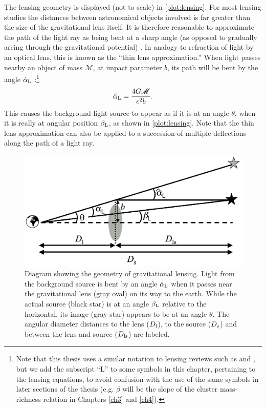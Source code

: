 The lensing geometry is displayed (not to scale) in \autoref{plot:lensing}. For most lensing studies the distances between astronomical objects involved is far greater than the size of the gravitational lens itself. It is therefore reasonable to approximate the path of the light ray as being bent at a sharp angle (as opposed to gradually arcing through the gravitational potential) \citep{BS01}. In analogy to refraction of light by an optical lens, this is known as the ``thin lens approximation.'' When light passes nearby an object of mass ${\mathscr M}$, at impact parameter $b$, its path will be bent by the angle $\hat{\alpha}_{\rm L}$ \citep{RydenText}:\footnote{Note that this thesis uses a similar notation to lensing reviews such as \citet{BS01} and \citet{Schneider06_WeakGravLens}, but we add the subscript ``L'' to some symbols in this chapter, pertaining to the lensing equations, to avoid confusion with the use of the same symbols in later sections of the thesis (e.g. $\beta$ will be the slope of the cluster mass-richness relation in Chapters \ref{ch3} and \ref{ch4}).}
\begin{equation}
\label{eqn:deflection}
\hat{\alpha}_{\rm L} = \frac{4G{\mathscr M}}{c^2 b}.
\end{equation}
This causes the background light source to appear as if it is at an angle $\theta$, when it is really at angular position $\beta_{\rm L}$, as shown in \autoref{plot:lensing}. Note that the thin lens approximation can also be applied to a succession of multiple deflections along the path of a light ray.

\begin{figure}
\begin{center}
\includegraphics[scale=0.4]{plots_intro/LensDiagram.png}
\caption[Gravitational Lensing Diagram]{Diagram showing the geometry of gravitational lensing. Light from the background source is bent by an angle $\hat{\alpha}_{\rm L}$ when it passes near the gravitational lens (gray oval) on its way to the earth. While the actual source (black star) is at an angle $\beta_{\rm L}$ relative to the horizontal, its image (gray star) appears to be at an angle $\theta$. The angular diameter distances to the lens ($D_{\rm l}$), to the source ($D_{\rm s}$) and between the lens and source ($D_{\rm ls}$) are labeled.}
\label{plot:lensing}
\end{center}
\end{figure}


